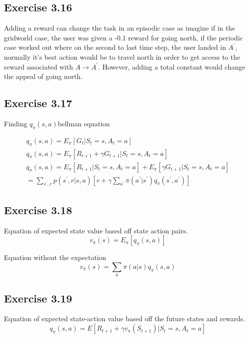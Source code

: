 \subsection{Exercise 3.16}
Adding a reward can change the task in an episodic case as imagine if in the gridworld case, the user was given a -0.1 reward for going north, if the periodic case worked out where on the second to last time step, the user landed in $A^\prime$, normally it's best action would be to travel north in order to get access to the reward associated with $A \rightarrow A^\prime$. However, adding a total constant would change the appeal of going north.

\subsection{Exercise 3.17}
Finding $q_\pi(s,a)$bellman equation

\begin{gather}
  q_\pi(s,a) = E_\pi[G_t | S_t=s, A_t = a] \\
  q_\pi(s,a) = E_\pi[R_{t+1} + \gamma G_{t+1} | S_t=s, A_t = a] \\
  q_\pi(s,a) = E_\pi[R_{t+1} | S_t= s, A_t = a] + E_\pi[\gamma G_{t+1} | S_t=s, A_t = a] \\
  = \sum_{s^\prime,r} p(s^\prime, r | s,a)[r + \gamma \sum_{a^\prime} \pi(a^\prime|s^\prime) q_\pi(s^\prime,a^\prime)]
\end{gather}

\subsection{Exercise 3.18}
Equation of expected state value based off state action pairs. 
\begin{equation}
  v_\pi(s) = E_\pi[q_\pi(s,a)]
\end{equation}

Equation without the expectation
\begin{equation}
  v_\pi(s) = \sum_{a}\pi(a|s) q_\pi(s,a)
\end{equation}

\subsection{Exercise 3.19}
Equation of expected state-action value based off the future states and rewards.
\begin{equation}
  q_\pi(s,a) = E[R_{t+1} + \gamma v_\pi(S_{t+1}) | S_t = s, A_t = a ]
\end{equation}

